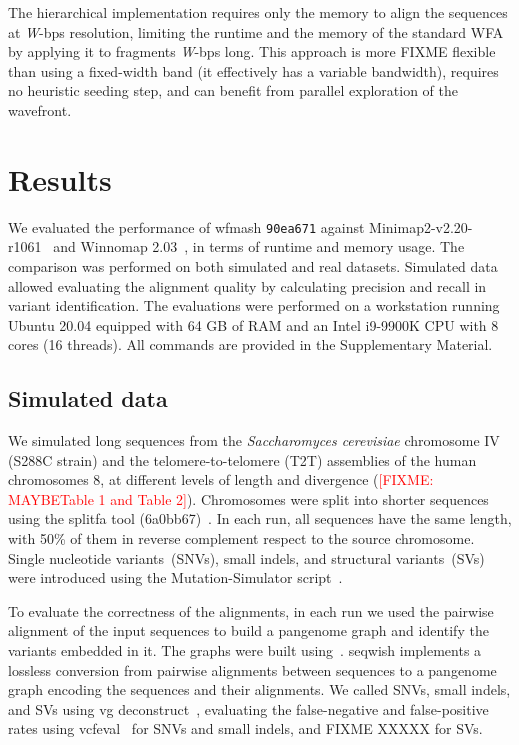 \documentclass{bioinfo}
\newcommand{\red}[1]{{\textcolor{Red}{#1}}}
\newcommand{\FIXME}[1]{\red{[FIXME: #1]}}
\begin{document}
The hierarchical implementation requires only the memory to align the sequences at \textit{W}-bps resolution,
limiting the runtime and the memory of the standard WFA by applying it to fragments \textit{W}-bps long.
This approach is more FIXME flexible than using a fixed-width band (it effectively has a variable bandwidth), requires
no heuristic seeding step, and can benefit from parallel exploration of the wavefront.



\section{Results}

We evaluated the performance of wfmash \texttt{90ea671} against Minimap2-v2.20-r1061~\citep{29750242} and
Winnomap 2.03~\citep{XXX}, in terms of runtime and memory usage. The comparison was performed on both simulated
and real datasets. Simulated data allowed evaluating the alignment quality by calculating precision and recall
in variant identification. The evaluations were performed on a workstation running Ubuntu 20.04 equipped with
64 GB of RAM and an Intel i9-9900K CPU with 8 cores (16 threads). All commands are provided in the Supplementary Material.

\subsection{Simulated data}
We simulated long sequences from the \textit{Saccharomyces cerevisiae} chromosome IV (S288C strain) and the
telomere-to-telomere (T2T) assemblies of the human chromosomes 8, at different levels of length and divergence
(\FIXME{MAYBETable 1 and Table 2}). Chromosomes were split into shorter sequences using the splitfa tool (6a0bb67)~\citep{splitfa}.
In each run, all sequences have the same length, with 50\% of them in reverse complement respect to the source
chromosome. Single nucleotide variants~(SNVs), small indels, and structural variants~(SVs) were introduced
using the Mutation-Simulator script~\citep{32780803}.

To evaluate the correctness of the alignments, in each run we used the pairwise alignment of the input sequences to build
a pangenome graph and identify the variants embedded in it. The graphs were built using~\citep{seqwish}.
seqwish implements a lossless conversion from pairwise alignments between sequences to a pangenome graph encoding the
sequences and their alignments. We called SNVs, small indels, and SVs using vg deconstruct~\citep{30125266},
evaluating the false-negative and false-positive rates using vcfeval~\citep{vcfeval} for SNVs and small indels,
and FIXME XXXXX for SVs.
\end{document}
